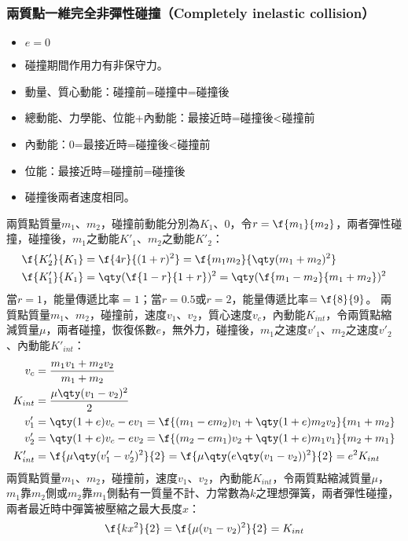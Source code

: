 \documentclass[a4paper,12pt]{article}
\begin{document}
\subsubsection{兩質點一維完全非彈性碰撞（Completely inelastic collision）}
\begin{itemize}
\item $e=0$
\item 碰撞期間作用力有非保守力。
\item 動量、質心動能：碰撞前=碰撞中=碰撞後
\item 總動能、力學能、位能+內動能：最接近時=碰撞後<碰撞前
\item 內動能：0=最接近時=碰撞後<碰撞前
\item 位能：最接近時=碰撞前=碰撞後
\item 碰撞後兩者速度相同。
\end{itemize}
兩質點質量$m_1$、$m_2$，碰撞前動能分別為$K_1$、$0$，令$r=\f{m_1}{m_2}$，兩者彈性碰撞，碰撞後，$m_1$之動能$K'_1$、$m_2$之動能$K'_2$：
\[\begin{aligned}
\f{K'_2}{K_1} &= \f{4r}{(1+r)^2} = \f{m_1m_2}{\qty(m_1+m_2)^2} \\
\f{K'_1}{K_1} &= \qty(\f{1-r}{1+r})^2 = \qty(\f{m_1-m_2}{m_1+m_2})^2
\end{aligned}\]
當$r=1$，能量傳遞比率$=1$；當$r=0.5$或$r=2$，能量傳遞比率$=\f{8}{9}$。
兩質點質量$m_1$、$m_2$，碰撞前，速度$v_1$、$v_2$，質心速度$v_c$，內動能$K_{int}$，令兩質點縮減質量$\mu$，兩者碰撞，恢復係數$e$，無外力，碰撞後，$m_1$之速度$v'_1$、$m_2$之速度$v'_2$、內動能$K'_{int}$：
\[\begin{aligned}
v_c &= \frac{m_1v_1+m_2v_2}{m_1+m_2} \\
K_{int} &= \frac{\mu\qty(v_1-v_2)^2}{2}\\
v'_1 &= \qty(1+e)v_c - ev_1 = \f{(m_1-em_2)v_1+\qty(1+e)m_2v_2}{m_1+m_2} \\
v'_2 &= \qty(1+e)v_c - ev_2 = \f{(m_2-em_1)v_2+\qty(1+e)m_1v_1}{m_2+m_1} \\
K'_{int} &= \f{\mu \qty(v'_1-v'_2)^2}{2} = \f{\mu \qty(e\qty(v_1-v_2))^2}{2} = e^2K_{int}
\end{aligned}\]
兩質點質量$m_1$、$m_2$，碰撞前，速度$v_1$、$v_2$，內動能$K_{int}$，令兩質點縮減質量$\mu$，$m_1$靠$m_2$側或$m_2$靠$m_1$側黏有一質量不計、力常數為$k$之理想彈簧，兩者彈性碰撞，兩者最近時中彈簧被壓縮之最大長度$x$：
\[ \f{kx^2}{2} = \f{\mu (v_1-v_2)^2}{2} = K_{int} \]
\end{document}
